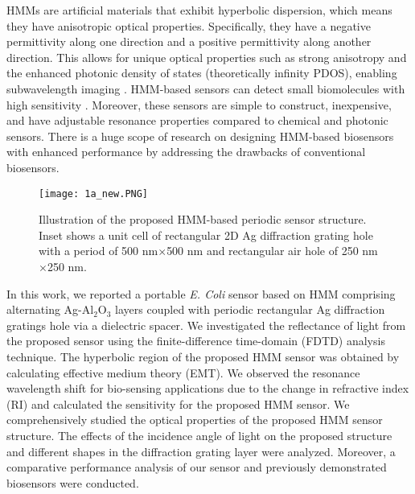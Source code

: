 \documentclass[conference]{IEEEtran}
\begin{document}
HMMs are artificial materials that exhibit hyperbolic dispersion, which means they have anisotropic optical properties. Specifically, they have a negative permittivity along one direction and a positive permittivity along another direction. This allows for unique optical properties such as strong anisotropy and the enhanced photonic density of states (theoretically infinity PDOS), enabling subwavelength imaging \cite{HMM book}. HMM-based sensors can detect small biomolecules with high sensitivity \cite{Sreekanth2016, Wang}. Moreover, these sensors are simple to construct, inexpensive, and have adjustable resonance properties compared to chemical and photonic sensors. There is a huge scope of research on designing HMM-based biosensors with enhanced performance by addressing the drawbacks of conventional biosensors. 
\begin{figure}[ht]
\centering
\texttt{[image: 1a\_new.PNG]}
\caption{Illustration of the proposed HMM-based periodic sensor structure. Inset shows a unit cell of rectangular 2D Ag diffraction grating hole with a period of 500 nm$\times$500 nm and rectangular air hole of 250 nm$\times$250 nm.}
\label{fig:1}
\end{figure}

In this work, we reported a portable \textit{E. Coli} sensor based on HMM comprising alternating Ag-Al$_2$O$_3$ layers coupled with periodic rectangular Ag diffraction gratings hole via a dielectric spacer. We investigated the reflectance of light from the proposed sensor using the finite-difference time-domain (FDTD) analysis technique. The hyperbolic region of the proposed HMM sensor was obtained by calculating effective medium theory (EMT). We observed the resonance wavelength shift for bio-sensing applications due to the change in refractive index (RI) and calculated the sensitivity for the proposed HMM sensor. We comprehensively studied the optical properties of the proposed HMM sensor structure. The effects of the incidence angle of light on the proposed structure and different shapes in the diffraction grating layer were analyzed. Moreover, a comparative performance analysis of our sensor and previously demonstrated biosensors were conducted.  
\end{document}
